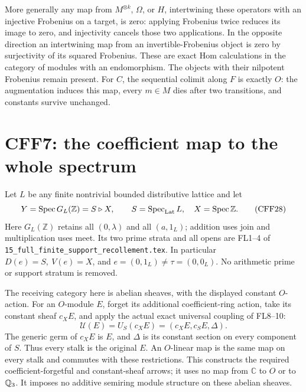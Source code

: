 More generally any map from \(M^{\otimes k}\), \(\Omega\), or
\(H\), intertwining these operators with an injective
Frobenius on a target, is zero: applying Frobenius twice
reduces its image to zero, and injectivity cancels those two
applications. In the opposite direction an intertwining
map from an invertible-Frobenius object is zero by
surjectivity of its squared Frobenius. These are exact Hom
calculations in the category of modules with an endomorphism.
The objects with their nilpotent Frobenius remain present.
For \(C\), the sequential colimit along \(F\) is exactly \(O\):
the augmentation induces this map, every \(m\in M\) dies
after two transitions, and constants survive unchanged.

\section{CFF7: the coefficient map to the whole spectrum}
Let \(L\) be any finite nontrivial bounded distributive
lattice and let
\[
 Y=\operatorname{Spec} G_L(\mathbb Z)=S\triangleright X,\qquad
 S=\operatorname{Spec}_{\rm Lat} L,\quad X=\operatorname{Spec}\mathbb Z.
 \tag{CFF28}
\]
Here \(G_L(\mathbb Z)\) retains all \((0,\lambda)\) and all
\((a,1_L)\); addition uses join and multiplication uses meet.
Its two prime strata and all opens are FL1--4 of
\texttt{15\_full\_finite\_support\_recollement.tex}.
In particular \(D(e)=S,\ V(e)=X\), and \(e=(0,1_L)\ne
\tau=(0,0_L)\). No arithmetic prime or support stratum is
removed.

The receiving category here is abelian sheaves, with the
displayed constant \(O\)-action. For an \(O\)-module \(E\),
forget its additional coefficient-ring action, take its
constant sheaf \(c_XE\), and apply the actual exact universal
coupling of FL8--10:
\[
 \mathcal U(E)=U_S(c_XE)
       =(c_XE,c_SE,\Delta).
 \tag{CFF29}
\]
The generic germ of \(c_XE\) is \(E\), and \(\Delta\) is its
constant section on every component of \(S\). Thus every
stalk is the original \(E\). An \(O\)-linear map is the same
map on every stalk and commutes with these restrictions.
This constructs the required coefficient-forgetful and
constant-sheaf arrows; it uses no map from \(\mathbb C\)
to \(O\) or to \(\mathbb Q_3\). It imposes no additive semiring
module structure on these abelian sheaves.

